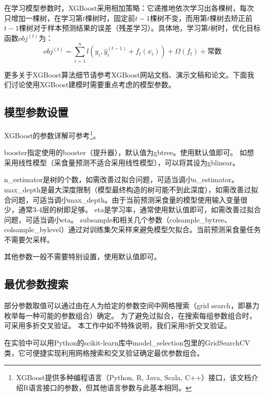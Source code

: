 在学习模型参数时，XGBoost采用相加策略：它递推地依次学习出各棵树，每次只增加一棵树，在学习第$t$棵树时，固定前$t-1$棵树不变，而用第$t$棵树去矫正前$t-1$棵树对于样本预测结果的误差（残差学习）。具体地，学习第$t$树时，优化目标函数$obj^{(t)}$为：
\begin{equation}
\label{objf_eachtree}
	obj^{(t)} = \sum_{i=1}^n l(y_i, \hat y_i^{(t-1)} + f_t(x_i)) + \Omega(f_t) + \textrm{常数}
\end{equation}

更多关于XGBoost算法细节请参考XGBoost网站文档、演示文稿和论文\cite{intro_xgboost, xgboost_slides,Chen2016XGBoost}。下面我们讨论使用XGBoost建模时需要重点考虑的模型参数。

\subsection{模型参数设置}

XGBoost的参数详解可参考\cite{xgboost_para}\footnote{XGBoost提供多种编程语言（Python, R, Java, Scala, C++）接口，该文档介绍R语言接口的参数，但其他语言参数与此基本相同。}。

booster指定使用的booster（提升器），默认值为gbtree。使用默认值即可。
如想采用线性模型（采食量预测不适合采用线性模型），可以将其设为gblinear。

n\_estimator是树的个数，如需改善过拟合问题，可适当调小n\_estimator。
max\_depth是最大深度限制（模型最终构造的树可能不到此深度），如需改善过拟合问题，可适当调小max\_depth。由于当前预测采食量的模型使用输入变量很少，通常3-4层的树即足够。
eta是学习率，通常使用默认值即可，如需改善过拟合问题，可适当调小eta。
subsample和相关几个参数（colsample\_bytree、colsample\_bylevel）通过对训练集欠采样来避免模型欠拟合。当前预测采食量任务不需要欠采样。

其他参数一般不需要特别设置，使用默认值即可。

\subsection{最优参数搜索}
\label{best_para}

部分参数取值可以通过由在人为给定的参数空间中网格搜索（grid search，即暴力枚举每一种可能的参数组合）确定。
为了避免过拟合，在搜索每组参数组合时，可采用多折交叉验证。
本工作中如不特殊说明，我们采用8折交叉验证。

在实验中可以用Python的scikit-learn库中model\_selection包里的GridSearchCV类\cite{grid_search}，它可便捷实现利用网格搜索和交叉验证确定最优参数组合。



